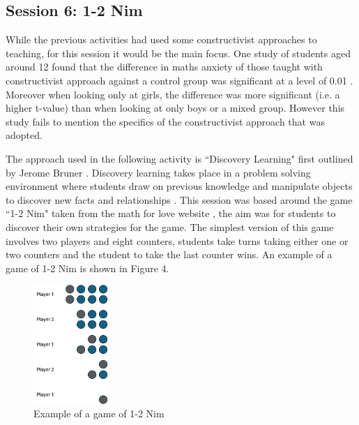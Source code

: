 \documentclass[11pt, a4paper, notitlepage]{article}
\begin{document}
\subsection{Session 6: 1-2 Nim}
While the previous activities had used some constructivist approaches to teaching, for this session it would be the main focus. One study of students aged around 12 found that the difference in maths anxiety of those taught with constructivist approach against a control group was significant at a level of 0.01 \cite{Suman:2021}. Moreover when looking only at girls, the difference was more significant (i.e. a higher t-value) than when looking at only boys or a mixed group. However this study fails to mention the specifics of the constructivist approach that was adopted. 
\par
The approach used in the following activity is ``Discovery Learning" first outlined by Jerome Bruner \cite{Bruner:1961}. Discovery learning takes place in a problem solving environment where students draw on previous knowledge and manipulate objects to discover new facts and relationships \cite{learning-theories:Discovery-learning}. This session was based around the game ``1-2 Nim" taken from the math for love website \cite{1-2Nim}, the aim was for students to discover their own strategies for the game. The simplest version of this game involves two players and eight counters, students take turns taking either one or two counters and the student to take the last counter wins. An example of a game of 1-2 Nim is shown in Figure 4.
\par
\begin{figure}[htbp]
    \centering
    \includegraphics[width=0.25\textwidth]{Images/1-2Nim_example.png}
    \caption{Example of a game of 1-2 Nim}
    \end{figure}
\end{document}
